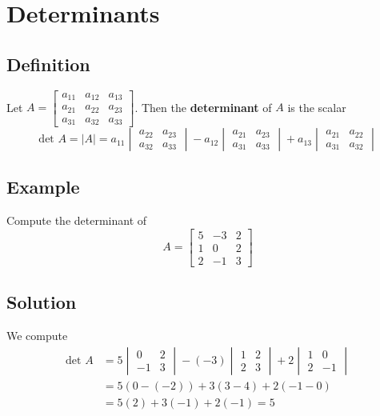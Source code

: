 \section{Determinants}

\subsection*{Definition}
Let $A=\begin{bmatrix}
        a_{11} & a_{12} & a_{13} \\
        a_{21} & a_{22} & a_{23} \\
        a_{31} & a_{32} & a_{33}
    \end{bmatrix}$. Then the \textbf{determinant} of $A$ is the scalar
\[
    \text{det }A=|A|=a_{11}\begin{vmatrix}
        a_{22} & a_{23} \\
        a_{32} & a_{33}
    \end{vmatrix}-a_{12}\begin{vmatrix}
        a_{21} & a_{23} \\
        a_{31} & a_{33}
    \end{vmatrix}+a_{13}\begin{vmatrix}
        a_{21} & a_{22} \\
        a_{31} & a_{32}
    \end{vmatrix}
\]

\subsection*{Example}
Compute the determinant of
\[A=\begin{bmatrix}
        5 & -3 & 2 \\
        1 & 0  & 2 \\
        2 & -1 & 3
    \end{bmatrix}\]

\subsection*{Solution}
We compute
\begin{align*}
    \text{det }A & =5\begin{vmatrix}
        0  & 2 \\
        -1 & 3
    \end{vmatrix}-(-3)\begin{vmatrix}
        1 & 2 \\
        2 & 3
    \end{vmatrix}+2\begin{vmatrix}
        1 & 0  \\
        2 & -1
    \end{vmatrix} \\
                 & =5(0-(-2))+3(3-4)+2(-1-0)                                                               \\
                 & =5(2)+3(-1)+2(-1)=5
\end{align*}


